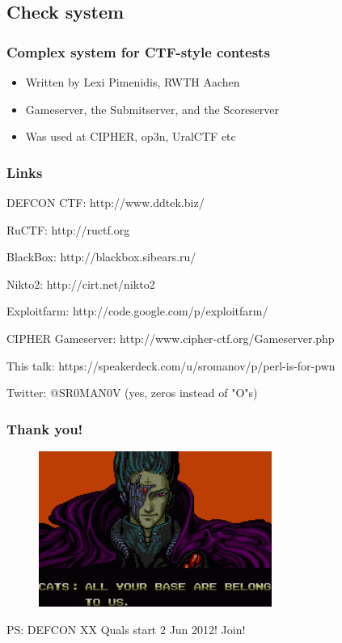 \documentclass{beamer}
\begin{document}
\subsection{Check system}
\frame
{
\frametitle{Complex system for CTF-style contests}
\begin{itemize}
\item<1-> Written by Lexi Pimenidis, RWTH Aachen
\item<1-> Gameserver, the Submitserver, and the Scoreserver
\item<1-> Was used at CIPHER, op3n, UralCTF	etc
\end{itemize}
}

\frame
{
\frametitle{Links}
\item DEFCON CTF: http://www.ddtek.biz/
\item RuCTF: http://ructf.org
\item BlackBox: http://blackbox.sibears.ru/
\item Nikto2: http://cirt.net/nikto2
\item Exploitfarm: http://code.google.com/p/exploitfarm/
\item CIPHER Gameserver: http://www.cipher-ctf.org/Gameserver.php
\item This talk: https://speakerdeck.com/u/sromanov/p/perl-is-for-pwn
\item Twitter: @SR0MAN0V (yes, zeros instead of "O"s)
}

\frame
{
\frametitle{Thank you!}
\begin{figure}
\includegraphics[width=3in,height=2in]{pics/aybabtu.png}
\end{figure}

PS: DEFCON XX Quals start 2 Jun 2012! Join!
}
\end{document}
